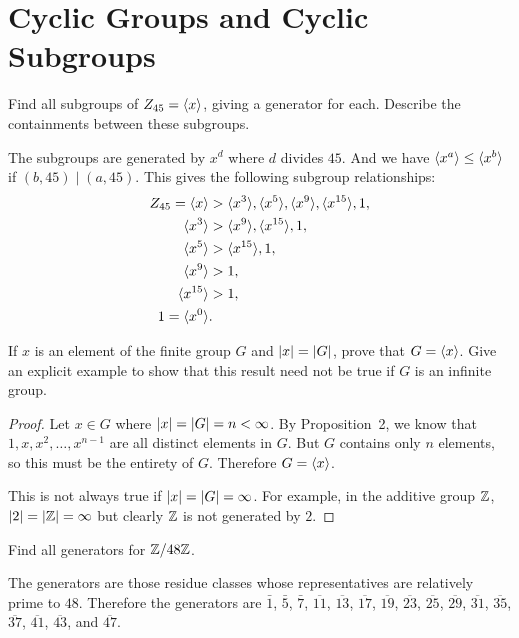 \section{Cyclic Groups and Cyclic Subgroups}

 Find all subgroups of $Z_{45} = \langle{x}\rangle$, giving a
generator for each. Describe the containments between these subgroups.
\begin{solution}
  The subgroups are generated by $x^d$ where $d$ divides $45$. And we
  have $\langle{x^a}\rangle \leq \langle{x^b}\rangle$ if $(b,45) \mid (a,45)$. This gives
  the following subgroup relationships:
  \begin{align*}
    Z_{45} = \gen{x} &> \gen{x^3}, \gen{x^5},
                       \gen{x^9}, \gen{x^{15}}, 1, \\
    \gen{x^3} &> \gen{x^9}, \gen{x^{15}}, 1, \\
    \gen{x^5} &> \gen{x^{15}}, 1, \\
    \gen{x^9} &> 1, \\
    \gen{x^{15}} &> 1, \\
    1 = \gen{x^0}\rlap. & \qedhere
  \end{align*}
\end{solution}

 If $x$ is an element of the finite group $G$ and
$\lvert{x}\rvert = \lvert{G}\rvert$, prove that $G = \langle{x}\rangle$. Give an explicit
example to show that this result need not be true if $G$ is an
infinite group.
\begin{proof}
  Let $x\in G$ where $\lvert{x}\rvert = \lvert{G}\rvert = n < \infty$. By
  Proposition~2, we know that $1, x, x^2, \dots, x^{n-1}$ are all
  distinct elements in $G$. But $G$ contains only $n$ elements, so
  this must be the entirety of $G$. Therefore $G = \langle{x}\rangle$.

  This is not always true if $\lvert{x}\rvert = \lvert{G}\rvert = \infty$. For
  example, in the additive group $\mathbb{Z}$, $\lvert{2}\rvert = \lvert{\mathbb{Z}}\rvert = \infty$
  but clearly $\mathbb{Z}$ is not generated by $2$.
\end{proof}

 Find all generators for $\mathbb{Z}/48\mathbb{Z}$.
\begin{solution}
  The generators are those residue classes whose representatives are
  relatively prime to $48$. Therefore the generators are $\bar1$,
  $\bar5$, $\bar7$, $\overline{11}$, $\overline{13}$, $\overline{17}$,
  $\overline{19}$, $\overline{23}$, $\overline{25}$, $\overline{29}$,
  $\overline{31}$, $\overline{35}$, $\overline{37}$, $\overline{41}$,
  $\overline{43}$, and $\overline{47}$.
\end{solution}

